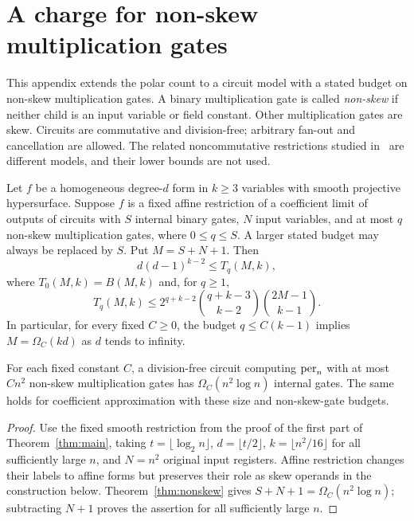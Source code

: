 \section{A charge for non-skew multiplication gates}\label{app:nonskew}

This appendix extends the polar count to a circuit model with a stated
budget on non-skew multiplication gates. A binary multiplication
gate is called \emph{non-skew} if neither child is an input variable or
field constant. Other multiplication gates are skew. Circuits are
commutative and division-free; arbitrary fan-out and cancellation are
allowed. The related noncommutative restrictions studied
in~\cite{LMS} are different models, and their lower bounds are not used.

\begin{theorem}\label{thm:nonskew}
Let $f$ be a homogeneous degree-$d$ form in $k\ge3$ variables with
smooth projective hypersurface. Suppose $f$ is a fixed affine
restriction of a coefficient limit of outputs of circuits with $S$
internal binary gates, $N$ input variables, and at most $q$ non-skew
multiplication gates, where $0\le q\le S$. A larger stated budget may
always be replaced by $S$. Put $M=S+N+1$. Then
\[
 d(d-1)^{k-2}\le T_q(M,k),
\]
where $T_0(M,k)=B(M,k)$ and, for $q\ge1$,
\begin{equation}\label{eq:nonskew-count}
 T_q(M,k)\le
 2^{q+k-2}\binom{q+k-3}{k-2}\binom{2M-1}{k-1}.
\end{equation}
In particular, for every fixed $C\ge0$, the budget $q\le C(k-1)$
implies $M=\Omega_C(kd)$ as $d$ tends to infinity.
\end{theorem}

\begin{corollary}\label{cor:nonskew-per}
For each fixed constant $C$, a division-free circuit computing
$\operatorname{per}_n$ with at most $Cn^2$ non-skew multiplication gates has
$\Omega_C(n^2\log n)$ internal gates. The same holds for coefficient
approximation with these size and non-skew-gate budgets.
\end{corollary}

\begin{proof}
Use the fixed smooth restriction from the proof of
the first part of Theorem~\ref{thm:main}, taking
$t=\lfloor\log_2 n\rfloor$, $d=\lfloor t/2\rfloor$,
$k=\lfloor n^2/16\rfloor$ for all sufficiently large $n$,
and $N=n^2$ original
input registers. Affine restriction changes their labels to affine
forms but preserves their role as skew operands in the construction
below. Theorem~\ref{thm:nonskew} gives
$S+N+1=\Omega_C(n^2\log n)$; subtracting $N+1$ proves the assertion
for all sufficiently large $n$.
\end{proof}

